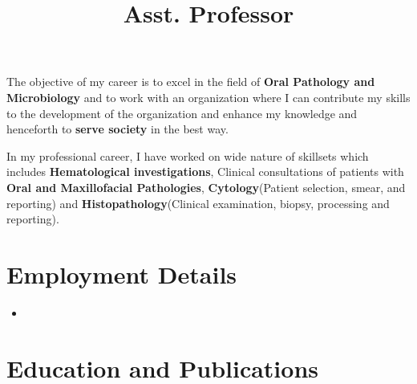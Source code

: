 \documentclass[11pt,a4paper,sans]{moderncv}        %
\title{Asst. Professor}                               %
\begin{document}
\makecvtitle

The objective of my career is to excel in the field of \textbf{Oral Pathology and Microbiology} and to work with an
organization where I can contribute my skills to the development of the organization and enhance
my knowledge and henceforth to \textbf{serve society} in the best way.



\vspace{5pt}
In my professional career, I have worked on wide nature of skillsets which includes \textbf{Hematological investigations},
Clinical consultations of patients with \textbf{Oral and Maxillofacial Pathologies}, \textbf{Cytology}(Patient
selection, smear, and reporting) and \textbf{Histopathology}(Clinical examination, biopsy, processing and reporting).

\section{Employment Details}

\begin{itemize}

\item{
{
\vspace{3pt}
\vspace{3pt}
\vspace{3pt}
\vspace{3pt}
\vspace{3pt}
}}
\end{itemize}


\section{Education and Publications}
\end{document}
